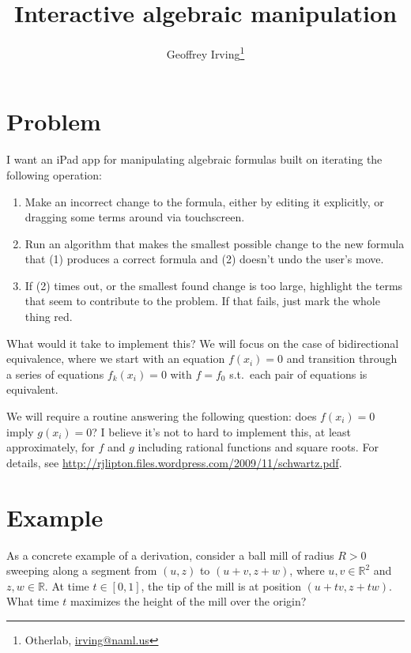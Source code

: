 \documentclass[11pt]{article}
\title{Interactive algebraic manipulation}
\author{Geoffrey Irving\thanks{Otherlab, \url{irving@naml.us}}}
\newcommand{\R}{\mathbb{R}}
\begin{document}
\maketitle

\section{Problem}

I want an iPad app for manipulating algebraic formulas built on iterating the following operation:
\begin{enumerate}
\item Make an incorrect change to the formula, either by editing it explicitly, or dragging some terms
      around via touchscreen.
\item Run an algorithm that makes the smallest possible change to the new formula that (1) produces a
      correct formula and (2) doesn't undo the user's move.
\item If (2) times out, or the smallest found change is too large, highlight the terms that seem to
      contribute to the problem. If that fails, just mark the whole thing red.
\end{enumerate}

What would it take to implement this?  We will focus on the case of bidirectional equivalence, where
we start with an equation $f(x_i) = 0$ and transition through a series of equations $f_k(x_i) = 0$
with $f = f_0$ s.t.\ each pair of equations is equivalent.

We will require a routine answering the following question: does $f(x_i) = 0$ imply $g(x_i) = 0$?
I believe it's not to hard to implement this, at least approximately, for $f$ and $g$ including
rational functions and square roots.  For details, see
\url{http://rjlipton.files.wordpress.com/2009/11/schwartz.pdf}.

\newpage
\section{Example}

As a concrete example of a derivation, consider a ball mill of radius $R > 0$ sweeping along a segment
from $(u,z)$ to $(u+v,z+w)$, where $u,v \in \R^2$ and $z,w \in \R$.  At time $t \in [0,1]$, the tip
of the mill is at position $(u+tv,z+tw)$.  What time $t$ maximizes the height of the mill over the origin?
\end{document}
